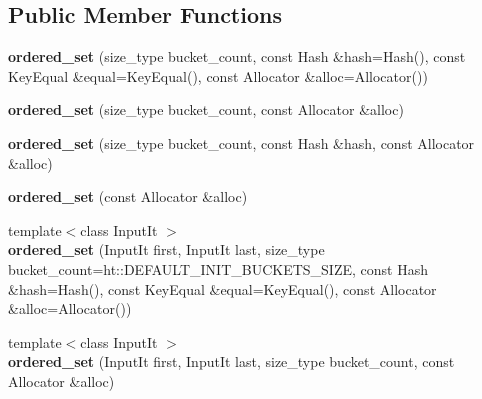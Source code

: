 \subsection*{Public Member Functions}
\begin{DoxyCompactItemize}
\item 
\mbox{\label{classtsl_1_1ordered__set_a4ec2418fd9c2d4ee6ee02f7b4fa0caa1}} 
{\bfseries ordered\+\_\+set} (size\+\_\+type bucket\+\_\+count, const Hash \&hash=Hash(), const Key\+Equal \&equal=Key\+Equal(), const Allocator \&alloc=Allocator())
\item 
\mbox{\label{classtsl_1_1ordered__set_a0a2c776d606ff253b16ded3ebc50f081}} 
{\bfseries ordered\+\_\+set} (size\+\_\+type bucket\+\_\+count, const Allocator \&alloc)
\item 
\mbox{\label{classtsl_1_1ordered__set_ab684dbea1303cf3173ea839eee34fd44}} 
{\bfseries ordered\+\_\+set} (size\+\_\+type bucket\+\_\+count, const Hash \&hash, const Allocator \&alloc)
\item 
\mbox{\label{classtsl_1_1ordered__set_a721a7fcbb629b9c000c2e77925b4fa36}} 
{\bfseries ordered\+\_\+set} (const Allocator \&alloc)
\item 
\mbox{\label{classtsl_1_1ordered__set_aad057518e7311f0437ec1f7b059525bd}} 
{\footnotesize template$<$class Input\+It $>$ }\\{\bfseries ordered\+\_\+set} (Input\+It first, Input\+It last, size\+\_\+type bucket\+\_\+count=ht\+::\+D\+E\+F\+A\+U\+L\+T\+\_\+\+I\+N\+I\+T\+\_\+\+B\+U\+C\+K\+E\+T\+S\+\_\+\+S\+I\+ZE, const Hash \&hash=Hash(), const Key\+Equal \&equal=Key\+Equal(), const Allocator \&alloc=Allocator())
\item 
\mbox{\label{classtsl_1_1ordered__set_a1925811490371805e060c1488063a545}} 
{\footnotesize template$<$class Input\+It $>$ }\\{\bfseries ordered\+\_\+set} (Input\+It first, Input\+It last, size\+\_\+type bucket\+\_\+count, const Allocator \&alloc)
\item 
\mbox{\label{classtsl_1_1ordered__set_a040a736e5534ba4a3c0467779df0b26b}} 

\end{DoxyCompactItemize}
